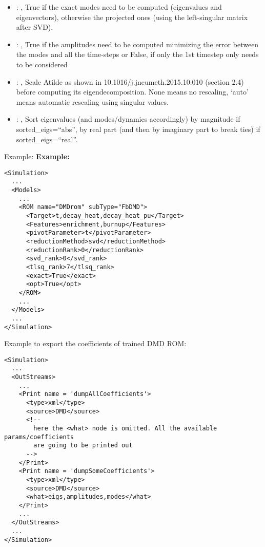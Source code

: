\begin{itemize}
    \item {}: , 
      True if the exact modes need to be computed (eigenvalues and
      eigenvectors),   otherwise the projected ones (using the left-singular matrix after SVD).

    \item {}: , 
      True if the amplitudes need to be computed minimizing the error
      between the modes and all the time-steps or False, if only the 1st timestep only needs to be
      considered

    \item {}: , 
      Scale Atilde as shown in 10.1016/j.jneumeth.2015.10.010 (section 2.4) before computing its
      eigendecomposition. None means no rescaling, ‘auto’ means automatic rescaling using singular
      values.

    \item {}: , 
      Sort eigenvalues (and modes/dynamics accordingly) by magnitude if sorted\_eigs=``abs'',
      by real part (and then by imaginary part to break ties) if sorted\_eigs=``real''.
  \end{itemize}

\hspace{24pt}
Example:
\textbf{Example:}
\begin{lstlisting}[style=XML,morekeywords={name,subType}]
<Simulation>
  ...
  <Models>
    ...
    <ROM name="DMDrom" subType="FbDMD">
      <Target>t,decay_heat,decay_heat_pu</Target>
      <Features>enrichment,burnup</Features>
      <pivotParameter>t</pivotParameter>
      <reductionMethod>svd</reductionMethod>
      <reductionRank>0</reductionRank>
      <svd_rank>0</svd_rank>
      <tlsq_rank>7</tlsq_rank>
      <exact>True</exact>
      <opt>True</opt>
    </ROM>
    ...
  </Models>
  ...
</Simulation>
\end{lstlisting}

Example to export the coefficients of trained DMD ROM:
\begin{lstlisting}[style=XML,morekeywords={name,subType}]
<Simulation>
  ...
  <OutStreams>
    ...
    <Print name = 'dumpAllCoefficients'>
      <type>xml</type>
      <source>DMD</source>
      <!--
        here the <what> node is omitted. All the available params/coefficients
        are going to be printed out
      -->
    </Print>
    <Print name = 'dumpSomeCoefficients'>
      <type>xml</type>
      <source>DMD</source>
      <what>eigs,amplitudes,modes</what>
    </Print>
    ...
  </OutStreams>
  ...
</Simulation>
\end{lstlisting}


